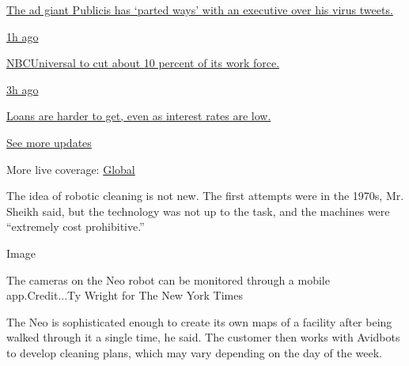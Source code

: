 \href{https://www.nytimes.com/live/2020/08/04/business/stock-market-today-coronavirus?action=click\&pgtype=Article\&state=default\&region=MAIN_CONTENT_1\&context=storylines_live_updates\#the-ad-giant-publicis-has-parted-ways-with-an-executive-over-his-virus-tweets}{The
ad giant Publicis has `parted ways' with an executive over his virus
tweets.}

\href{https://www.nytimes.com/live/2020/08/04/business/stock-market-today-coronavirus?action=click\&pgtype=Article\&state=default\&region=MAIN_CONTENT_1\&context=storylines_live_updates\#nbcuniversal-to-cut-about-10-percent-of-its-work-force}{1h
ago}

\href{https://www.nytimes.com/live/2020/08/04/business/stock-market-today-coronavirus?action=click\&pgtype=Article\&state=default\&region=MAIN_CONTENT_1\&context=storylines_live_updates\#nbcuniversal-to-cut-about-10-percent-of-its-work-force}{NBCUniversal
to cut about 10 percent of its work force.}

\href{https://www.nytimes.com/live/2020/08/04/business/stock-market-today-coronavirus?action=click\&pgtype=Article\&state=default\&region=MAIN_CONTENT_1\&context=storylines_live_updates\#loans-are-harder-to-get-even-as-interest-rates-are-low}{3h
ago}

\href{https://www.nytimes.com/live/2020/08/04/business/stock-market-today-coronavirus?action=click\&pgtype=Article\&state=default\&region=MAIN_CONTENT_1\&context=storylines_live_updates\#loans-are-harder-to-get-even-as-interest-rates-are-low}{Loans
are harder to get, even as interest rates are low.}

\href{https://www.nytimes.com/live/2020/08/04/business/stock-market-today-coronavirus?action=click\&pgtype=Article\&state=default\&region=MAIN_CONTENT_1\&context=storylines_live_updates}{See
more updates}

More live coverage:
\href{https://www.nytimes.com/2020/08/04/world/coronavirus-cases.html?action=click\&pgtype=Article\&state=default\&region=MAIN_CONTENT_1\&context=storylines_live_updates}{Global}

The idea of robotic cleaning is not new. The first attempts were in the
1970s, Mr. Sheikh said, but the technology was not up to the task, and
the machines were ``extremely cost prohibitive.''

Image

The cameras on the Neo robot can be monitored through a mobile
app.Credit...Ty Wright for The New York Times

The Neo is sophisticated enough to create its own maps of a facility
after being walked through it a single time, he said. The customer then
works with Avidbots to develop cleaning plans, which may vary depending
on the day of the week.

